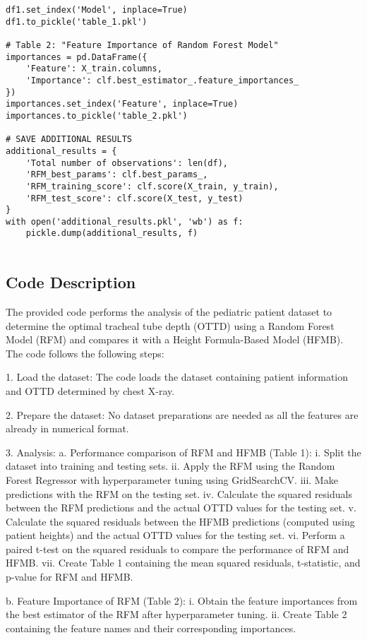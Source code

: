 \documentclass[11pt]{article}
\begin{document}
\begin{verbatim}
df1.set_index('Model', inplace=True)
df1.to_pickle('table_1.pkl')

# Table 2: "Feature Importance of Random Forest Model"
importances = pd.DataFrame({
    'Feature': X_train.columns,
    'Importance': clf.best_estimator_.feature_importances_
})
importances.set_index('Feature', inplace=True)
importances.to_pickle('table_2.pkl')

# SAVE ADDITIONAL RESULTS
additional_results = {
    'Total number of observations': len(df),
    'RFM_best_params': clf.best_params_,
    'RFM_training_score': clf.score(X_train, y_train),
    'RFM_test_score': clf.score(X_test, y_test)
}
with open('additional_results.pkl', 'wb') as f:
    pickle.dump(additional_results, f)
    

\end{verbatim}

\subsection{Code Description}

The provided code performs the analysis of the pediatric patient dataset to determine the optimal tracheal tube depth (OTTD) using a Random Forest Model (RFM) and compares it with a Height Formula-Based Model (HFMB). The code follows the following steps:

1. Load the dataset: The code loads the dataset containing patient information and OTTD determined by chest X-ray.

2. Prepare the dataset: No dataset preparations are needed as all the features are already in numerical format.

3. Analysis:
   a. Performance comparison of RFM and HFMB (Table 1): 
      i. Split the dataset into training and testing sets.
      ii. Apply the RFM using the Random Forest Regressor with hyperparameter tuning using GridSearchCV.
      iii. Make predictions with the RFM on the testing set.
      iv. Calculate the squared residuals between the RFM predictions and the actual OTTD values for the testing set.
      v. Calculate the squared residuals between the HFMB predictions (computed using patient heights) and the actual OTTD values for the testing set.
      vi. Perform a paired t-test on the squared residuals to compare the performance of RFM and HFMB.
      vii. Create Table 1 containing the mean squared residuals, t-statistic, and p-value for RFM and HFMB.

   b. Feature Importance of RFM (Table 2):
      i. Obtain the feature importances from the best estimator of the RFM after hyperparameter tuning.
      ii. Create Table 2 containing the feature names and their corresponding importances.
\end{document}

